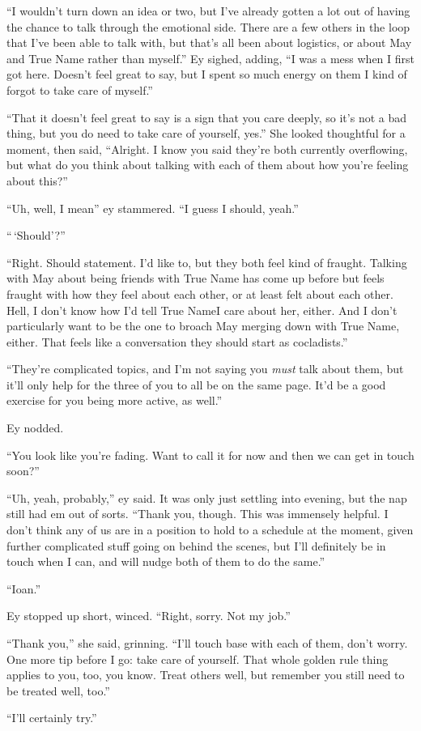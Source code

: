 ``I wouldn't turn down an idea or two, but I've already gotten a lot out of having the chance to talk through the emotional side. There are a few others in the loop that I've been able to talk with, but that's all been about logistics, or about May and True Name rather than myself.'' Ey sighed, adding, ``I was a mess when I first got here. Doesn't feel great to say, but I spent so much energy on them I kind of forgot to take care of myself.''

``That it doesn't feel great to say is a sign that you care deeply, so it's not a bad thing, but you do need to take care of yourself, yes.'' She looked thoughtful for a moment, then said, ``Alright. I know you said they're both currently overflowing, but what do you think about talking with each of them about how you're feeling about this?''

``Uh, well, I mean'' ey stammered. ``I guess I should, yeah.''

``\,`Should'?''

``Right. Should statement. I'd like to, but they both feel kind of fraught. Talking with May about being friends with True Name has come up before but feels fraught with how they feel about each other, or at least felt about each other. Hell, I don't know how I'd tell True NameI care about her, either. And I don't particularly want to be the one to broach May merging down with True Name, either. That feels like a conversation they should start as cocladists.''

``They're complicated topics, and I'm not saying you \emph{must} talk about them, but it'll only help for the three of you to all be on the same page. It'd be a good exercise for you being more active, as well.''

Ey nodded.

``You look like you're fading. Want to call it for now and then we can get in touch soon?''

``Uh, yeah, probably,'' ey said. It was only just settling into evening, but the nap still had em out of sorts. ``Thank you, though. This was immensely helpful. I don't think any of us are in a position to hold to a schedule at the moment, given further complicated stuff going on behind the scenes, but I'll definitely be in touch when I can, and will nudge both of them to do the same.''

``Ioan.''

Ey stopped up short, winced. ``Right, sorry. Not my job.''

``Thank you,'' she said, grinning. ``I'll touch base with each of them, don't worry. One more tip before I go: take care of yourself. That whole golden rule thing applies to you, too, you know. Treat others well, but remember you still need to be treated well, too.''

``I'll certainly try.''

